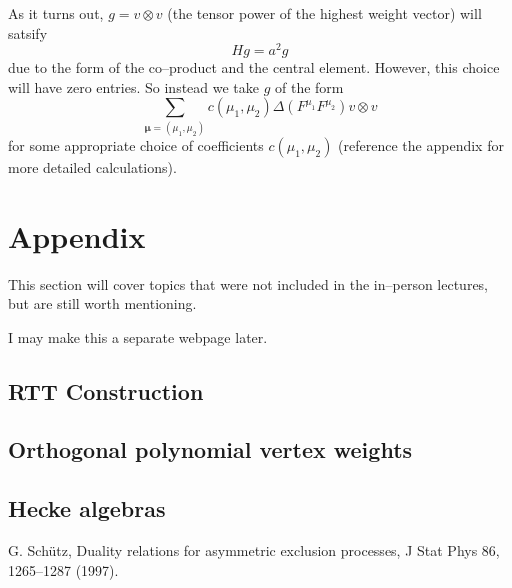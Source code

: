 \documentclass{ximera}
\begin{document}
As it turns out, $g=v\otimes v$ (the tensor power of the highest weight vector) will satsify 
$$
Hg=a^2g
$$
due to the form of the co--product and the central element. However, this choice will have zero entries. So instead we
take $g$ of the form
$$
\sum_{\boldsymbol{\mu}=(\mu_1,\mu_2)} c(\mu_1,\mu_2)\Delta(F^{\mu_1}F^{\mu_2}) v\otimes v
$$
for some appropriate choice of coefficients $c(\mu_1,\mu_2)$ (reference the appendix for more detailed calculations).

\section{Appendix}

This section will cover topics that were not included in the in--person lectures, but are still worth mentioning.

I may make this a separate webpage later.

\subsection{RTT Construction}



\subsection{Orthogonal polynomial vertex weights}

\subsection{Hecke algebras}

\begin{thebibliography}{10}

 G. Sch\"{u}tz, Duality relations for asymmetric exclusion processes, J Stat Phys 86, 1265–1287 (1997).

\end{thebibliography}
\end{document}
